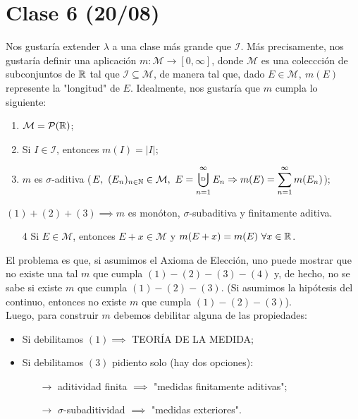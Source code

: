 
	\section{Clase 6 (20/08)}

	Nos gustaría extender $\lambda$ a una clase más grande que $\mathcal{I}$. Más precisamente, nos gustaría definir una aplicación $m : \mathcal{M} \to [0,\infty]$, donde $\mathcal{M}$ es una coleccción de subconjuntos de $\mathbb{R}$ tal que $\mathcal{I} \subseteq \mathcal{M}$, de manera tal que, dado $E \in \mathcal{M},\ m(E)$ represente la "longitud" de $E$. Idealmente, nos gustaría que $m$ cumpla lo siguiente:

	\begin{enumerate}
		\item $\mathcal{M} = \mathcal{P}(\mathbb{R})$;

		\item Si $I \in \mathcal{I}$, entonces $m(I) = |I|$;

		\item $m$ es $\sigma$-aditiva ($E,\ (E_n)_{n\in\N}\in \mathcal{M},\ E = \displaystyle\bigcupd_{n=1}^{\infty} E_n \implies m(E) = \sum_{n=1}^{\infty} m(E_n)$);
	\end{enumerate}

	\begin{ex}
		$(1)+(2)+(3) \implies m$ es monóton, $\sigma$-subaditiva y finitamente aditiva. 
	\end{ex}

	\begin{enumerate}
		\item[4] Si $E \in \mathcal{M}$, entonces $E + x \in \mathcal{M}$ y $m(E + x) = m(E)\ \forall x \in \mathbb{R}$.
	\end{enumerate}

	\noindent El problema es que, si asumimos el Axioma de Elección, uno puede mostrar que no existe una tal $m$ que cumpla $(1)-(2)-(3)-(4)$ y, de hecho, no se sabe si existe $m$ que cumpla $(1)-(2)-(3)$. (Si asumimos la hipótesis del continuo, entonces no existe $m$ que cumpla $(1)-(2)-(3)$). \\

	\noindent Luego, para construir $m$ debemos debilitar alguna de las propiedades:
	\begin{itemize}
		\item Si debilitamos $(1) \implies$ TEORÍA DE LA MEDIDA;
		
		\item Si debilitamos $(3)$ pidiento solo (hay dos opciones):

		\begin{itemize}
			\item[$\rightarrow$] aditividad finita $ \implies$ "medidas finitamente aditivas";
		
			\item[$\rightarrow$] $\sigma$-subaditividad $\implies$ "medidas exteriores".
		\end{itemize}
	\end{itemize}

